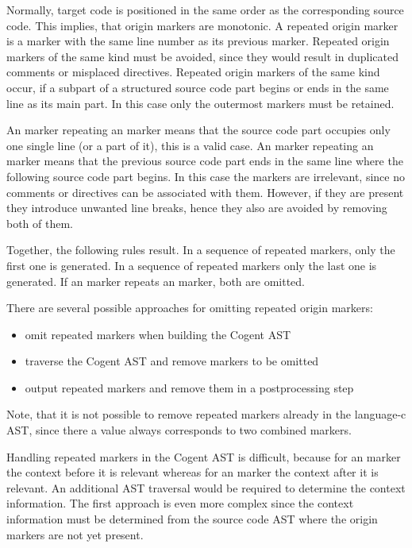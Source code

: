 Normally, target code is positioned in the same order as the corresponding source code. This implies, that
origin markers are monotonic. A repeated origin marker is a marker with the same line number as its previous marker.
Repeated origin markers of the same kind must be avoided, since they would result in duplicated comments or 
misplaced directives.
Repeated origin markers of the same kind occur, if a subpart of a structured source code part begins or ends 
in the same line as its main part. In this case only the outermost markers must be retained.

An  marker repeating an  marker means that the source code
part occupies only one single line (or a part of it), this is a valid case. 
An  marker repeating an  marker means that the previous source code
part ends in the same line where the following source code part begins. In this case the markers are
irrelevant, since no comments or directives can be associated with them. However, if they are
present they introduce unwanted line breaks, hence they also are avoided by removing both of them.

Together, the following rules result. In a sequence of repeated  markers, only the first one 
is generated. In a sequence of repeated  markers only the last one is generated.
If an  marker repeats an  marker, both are omitted.

There are several possible approaches for omitting repeated origin markers:
\begin{itemize}
\item omit repeated markers when building the Cogent AST
\item traverse the Cogent AST and remove markers to be omitted
\item output repeated markers and remove them in a postprocessing step
\end{itemize}
Note, that it is not possible to remove repeated markers already in the language-c AST, since there a 
value always corresponds to two combined markers.

Handling repeated markers in the Cogent AST is difficult, because for an  marker the context
before it is relevant whereas for an  marker the context after it is relevant. An additional
AST traversal would be required to determine the context information. The first approach is even more complex
since the context information must be determined from the source code AST where the origin markers are not
yet present. 

